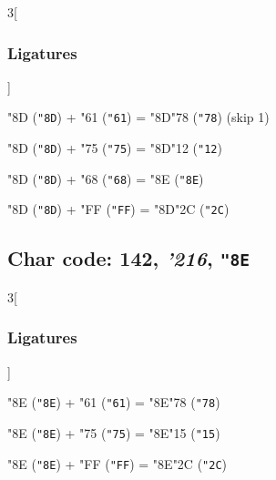 \documentclass{article}
\newlength{\maxcharwidth}
\begin{document}
\begin{multicols}{3}[\subsubsection{Ligatures}]

{\testfont\char"8D\noboundary} ({\tt"8D}) + {\testfont\char"61\noboundary} ({\tt"61}) = {\testfont\char"8D\noboundary}{\testfont\char"78\noboundary} ({\tt"78})  (skip 1)

{\testfont\char"8D\noboundary} ({\tt"8D}) + {\testfont\char"75\noboundary} ({\tt"75}) = {\testfont\char"8D\noboundary}{\testfont\char"12\noboundary} ({\tt"12}) 

{\testfont\char"8D\noboundary} ({\tt"8D}) + {\testfont\char"68\noboundary} ({\tt"68}) = {\testfont\char"8E\noboundary} ({\tt"8E}) 

{\testfont\char"8D\noboundary} ({\tt"8D}) + {\testfont\char"FF\noboundary} ({\tt"FF}) = {\testfont\char"8D\noboundary}{\testfont\char"2C\noboundary} ({\tt"2C}) 

\end{multicols}

\subsection{Char code: 142, {\it'216}, {\tt"8E}}
\label{char_142}


\begin{multicols}{3}[\subsubsection{Ligatures}]

{\testfont\char"8E\noboundary} ({\tt"8E}) + {\testfont\char"61\noboundary} ({\tt"61}) = {\testfont\char"8E\noboundary}{\testfont\char"78\noboundary} ({\tt"78}) 

{\testfont\char"8E\noboundary} ({\tt"8E}) + {\testfont\char"75\noboundary} ({\tt"75}) = {\testfont\char"8E\noboundary}{\testfont\char"15\noboundary} ({\tt"15}) 

{\testfont\char"8E\noboundary} ({\tt"8E}) + {\testfont\char"FF\noboundary} ({\tt"FF}) = {\testfont\char"8E\noboundary}{\testfont\char"2C\noboundary} ({\tt"2C}) 

\end{multicols}
\end{document}
